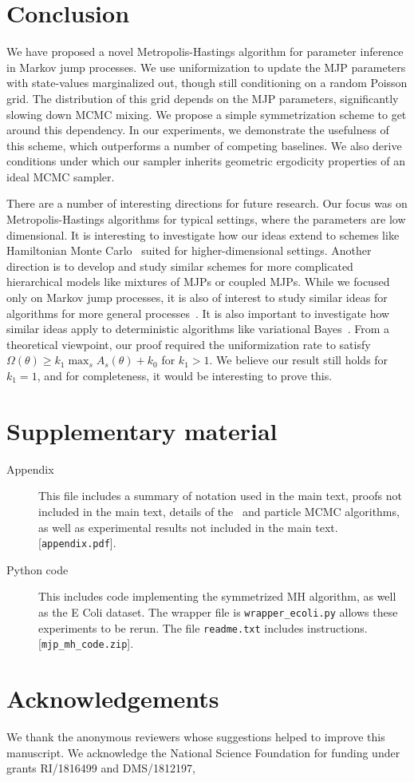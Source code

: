 \section{Conclusion}
We have proposed a novel Metropolis-Hastings algorithm for parameter 
inference in Markov jump processes. We use 
uniformization to update the MJP parameters with state-values marginalized 
out, though still conditioning on a random Poisson grid. The 
distribution of this grid depends on the MJP parameters, significantly 
slowing down MCMC mixing. We propose a simple symmetrization scheme to get 
around this dependency. In our experiments, we demonstrate the usefulness 
of this scheme, which outperforms a number of competing baselines.
We also derive conditions under which our sampler inherits geometric 
ergodicity properties of an ideal MCMC sampler.


There are a number of interesting directions for future research.
Our focus was on Metropolis-Hastings algorithms for typical settings,
where the parameters are low dimensional. It is interesting to 
investigate how our ideas extend to schemes like Hamiltonian Monte 
Carlo~\citep{Neal2010} suited for higher-dimensional settings. Another 
direction is to develop and study similar schemes for more complicated 
hierarchical models like mixtures of MJPs or coupled MJPs. While we 
focused only on Markov jump processes, it is also of interest to study 
similar ideas for algorithms for more general processes~\citep{RaoTeh12}. 
It is also important to investigate how similar ideas apply to 
deterministic algorithms like variational Bayes~\citep{OpperVarinf, panzharao17}. From 
a theoretical viewpoint, our proof required the uniformization rate to 
satisfy $\Omega(\theta) \ge k_1 \max_s A_s(\theta) + k_0$ for $k_1 > 1$. 
We believe our result still holds for $k_1 = 1$, and for completeness, 
it would be interesting to prove this.  


\section{Supplementary material}
\begin{description}
  \item[Appendix] This file includes a summary of notation used in the main text, proofs not included in the main text, details of the \naive\ and particle MCMC algorithms, as well as experimental results not included in the main text. [\texttt{appendix.pdf}]. 
\item[Python code] This includes code implementing the symmetrized MH algorithm, as well as the E Coli dataset.
  The wrapper file is {\texttt{wrapper\_ecoli.py}} allows these experiments to be rerun. The file {\texttt{readme.txt}} includes instructions.
 [\texttt{mjp\_mh\_code.zip}].
\end{description}

\section{Acknowledgements}
We thank the anonymous reviewers whose suggestions helped to improve this manuscript.
We acknowledge the National Science Foundation for funding under grants RI/1816499 and DMS/1812197,


